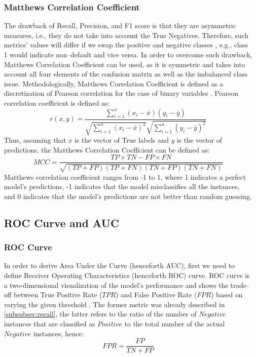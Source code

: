 \subsubsection{Matthews Correlation Coefficient}
The drawback of Recall, Precision, and F1 score is that they are asymmetric measures, i.e., they do not take into account the True Negatives.
Therefore, such metrics' values will differ if we swap the positive and negative classes \citep{chicco2020advantages}, e.g., class 1 would indicate non--default and vice versa.
In order to overcome such drawback, Matthews Correlation Coefficient can be used, as it is symmetric and takes into account all four elements of the confusion matrix as well as the imbalanced class issue.
Methodologically, Matthews Correlation Coefficient is defined as a discretization of Pearson correlation for the case of binary variables \citep{boughorbel2017optimal}.
Pearson correlation coefficient is defined as:
\begin{equation}\label{eq}
r(x,y) = \frac{\sum\limits_{i=1}^n (x_i - \bar{x})(y_i - \bar{y})}{\sqrt{\sum\limits_{i=1}^n (x_i - \bar{x})^2} \sqrt{\sum\limits_{i=1}^n (y_i - \bar{y})^2}}
\end{equation}
Thus, assuming that $x$ is the vector of True labels and $y$ is the vector of predictions, the Matthews Correlation Coefficient can be defined as:
\begin{equation}\label{eq}
MCC = \frac{TP \times TN - FP \times FN}{\sqrt{(TP + FP) (TP + FN) (TN + FP) (TN + FN)}}
\end{equation}
Matthews correlation coefficient ranges from -1 to 1, where 1 indicates a perfect model's predictions, -1 indicates that the model misclassifies all the instances, and 0 indicates that the model's predictions are not better than random guessing.


\newpage
\subsection{ROC Curve and AUC}
\subsubsection{ROC Curve}
In order to derive Area Under the Curve (henceforth AUC), first we need to define Receiver Operating Characteristics (henceforth ROC) curve.
ROC curve is a two-dimensional visualization of the model's performance and shows the trade--off between True Positive Rate ($TPR$) and False Positive Rate ($FPR$) based on varying the given threshold \citep{han2011data}. The former metric was already described in \autoref{subsubsec:recall}, the latter refers to the ratio of the number of $Negative$ instances that are classified as $Positive$ to the total number of the actual $Negative$ instances, hence:
\begin{equation}\label{eq}
FPR = \frac{FP}{TN + FP}
\end{equation}


